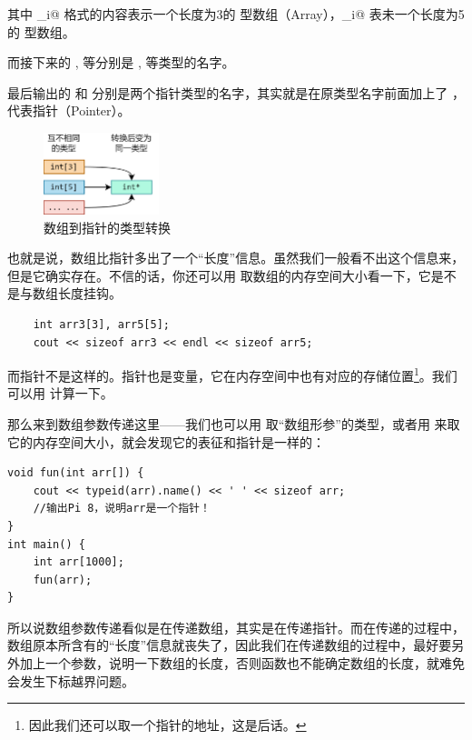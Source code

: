 其中 _i@ 格式的内容表示一个长度为3的 \lstinline@int@ 型数组（Array），_i@ 表未一个长度为5的 \lstinline@int@ 型数组。\par
而接下来的 \lstinline@i@, \lstinline@d@ 等分别是 \lstinline@int@, \lstinline@double@ 等类型的名字。\par
最后输出的 \lstinline@Pi@ 和 \lstinline@Pc@ 分别是两个指针类型的名字，其实就是在原类型名字前面加上了 \lstinline@P@ ，代表指针（Pointer）。\par
\begin{figure}[htbp]
    \centering
    \includegraphics[width=0.3\textwidth]{../images/generalized_parts/05_array_to_pointer_conversion.png}
    \caption{数组到指针的类型转换}    
\end{figure}
也就是说，数组比指针多出了一个``长度''信息。虽然我们一般看不出这个信息来，但是它确实存在。不信的话，你还可以用 \lstinline@sizeof@ 取数组的内存空间大小看一下，它是不是与数组长度挂钩。
\begin{lstlisting}
    int arr3[3], arr5[5];
    cout << sizeof arr3 << endl << sizeof arr5;
\end{lstlisting}
而指针不是这样的。指针也是变量，它在内存空间中也有对应的存储位置\footnote{因此我们还可以取一个指针的地址，这是后话。}。我们可以用 \lstinline@sizeof@ 计算一下。\par
那么来到数组参数传递这里——我们也可以用 \lstinline@typeid@ 取``数组形参''的类型，或者用 \lstinline@sizeof@ 来取它的内存空间大小，就会发现它的表征和指针是一样的：
\begin{lstlisting}
void fun(int arr[]) {
    cout << typeid(arr).name() << ' ' << sizeof arr;
    //输出Pi 8，说明arr是一个指针！
}
int main() {
    int arr[1000];
    fun(arr);
}
\end{lstlisting}\par
所以说数组参数传递看似是在传递数组，其实是在传递指针。而在传递的过程中，数组原本所含有的``长度''信息就丧失了，因此我们在传递数组的过程中，最好要另外加上一个参数，说明一下数组的长度，否则函数也不能确定数组的长度，就难免会发生下标越界问题。\par
